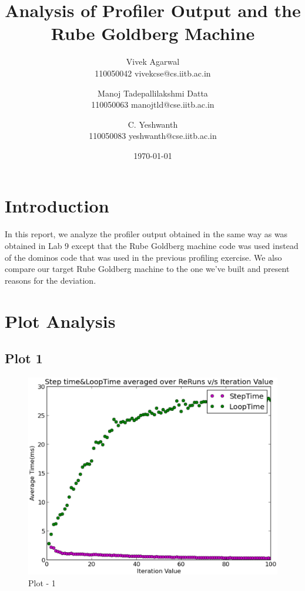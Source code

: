 \documentclass[11pt] {article}
\begin{document}
\title {Analysis of Profiler Output and the Rube Goldberg Machine}
\author 	{	Vivek Agarwal \\
				110050042 vivekcse@cs.iitb.ac.in \\
				\and
				Manoj Tadepallilakshmi Datta \\
			 	110050063 manojtld@cse.iitb.ac.in \\
			 	\and
			 	C. Yeshwanth \\
			 	110050083 yeshwanth@cse.iitb.ac.in}
\date{\today}
\maketitle

\section {Introduction}

In this report, we analyze the profiler output obtained in the same way as was obtained in Lab 9 except that the 
Rube Goldberg machine code was used instead of the dominos code that was used in the previous profiling exercise.
We also compare our target Rube Goldberg machine to the one we've built and present reasons for the deviation.

\section{Plot Analysis}

\subsection{Plot 1} \cite{1,2}

\begin {figure} [ht]
\begin {center}
\includegraphics[scale = 0.35] {1.eps}
\end {center}
\caption {Plot - 1}
\end {figure}
\end{document}
